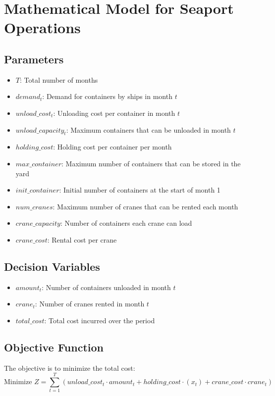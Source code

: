 \documentclass{article}
\begin{document}
\section*{Mathematical Model for Seaport Operations}

\subsection*{Parameters}
\begin{itemize}
    \item $T$: Total number of months
    \item $demand_t$: Demand for containers by ships in month $t$
    \item $unload\_cost_t$: Unloading cost per container in month $t$
    \item $unload\_capacity_t$: Maximum containers that can be unloaded in month $t$
    \item $holding\_cost$: Holding cost per container per month
    \item $max\_container$: Maximum number of containers that can be stored in the yard
    \item $init\_container$: Initial number of containers at the start of month 1
    \item $num\_cranes$: Maximum number of cranes that can be rented each month
    \item $crane\_capacity$: Number of containers each crane can load
    \item $crane\_cost$: Rental cost per crane
\end{itemize}

\subsection*{Decision Variables}
\begin{itemize}
    \item $amount_t$: Number of containers unloaded in month $t$
    \item $crane_t$: Number of cranes rented in month $t$
    \item $total\_cost$: Total cost incurred over the period
\end{itemize}

\subsection*{Objective Function}
The objective is to minimize the total cost:
\[
\text{Minimize } Z = \sum_{t=1}^{T} \left( unload\_cost_t \cdot amount_t + holding\_cost \cdot (x_t) + crane\_cost \cdot crane_t \right)
\]
\end{document}
